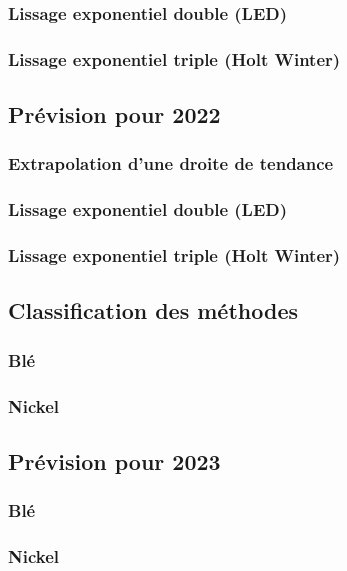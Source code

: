 \subsubsection{Lissage exponentiel double (LED)}
\subsubsection{Lissage exponentiel triple (Holt Winter)}
\subsection{Prévision pour 2022}
\subsubsection{Extrapolation d'une droite de tendance}
\subsubsection{Lissage exponentiel double (LED)}
\subsubsection{Lissage exponentiel triple (Holt Winter)}
\subsection{Classification des méthodes}
\subsubsection{Blé}
\subsubsection{Nickel}
\subsection{Prévision pour 2023}
\subsubsection{Blé}
\subsubsection{Nickel}